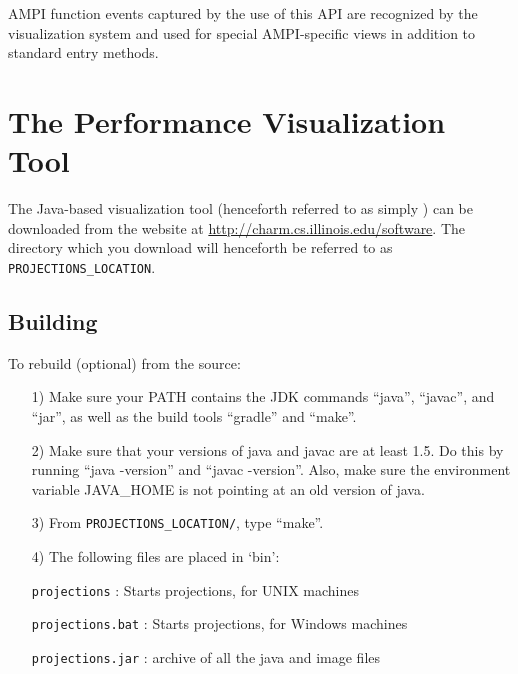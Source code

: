 \documentclass[10pt]{report}
\begin{document}
AMPI function events captured by the use of this API are recognized by
the visualization system and used for special AMPI-specific views in
addition to standard \charmpp{} entry methods.

%
%

\newpage

\chapter{The \projections{} Performance Visualization Tool}
\label{sec::visualization}

The \projections{} Java-based visualization tool (henceforth referred
to as simply \projections{}) can be downloaded from the \charmpp{}
website at \url{http://charm.cs.illinois.edu/software}.
The directory which you download will henceforth be referred to
as {\tt PROJECTIONS\_LOCATION}.

\section{Building \projections{}}

To rebuild \projections{} (optional) from the source:

\begin{enumerate}
\item[1)]
   Make sure your PATH contains the JDK commands ``java'', ``javac'',  and ``jar'',
   as well as the build tools ``gradle'' and ``make''.
\item[2)]
   Make sure that your versions of java and javac are at least 1.5. Do this by running ``java -version'' and ``javac -version''. Also, make sure the environment variable JAVA\_HOME is not pointing at an old version of java.
\item[3)]
   From {\tt PROJECTIONS\_LOCATION/}, type ``make''.
\item[4)]
   The following files are placed in `bin':

      {\tt projections}           : Starts projections, for UNIX machines

      {\tt projections.bat}       : Starts projections, for Windows machines

      {\tt projections.jar}       : archive of all the java and image files
\end{enumerate}
\end{document}
